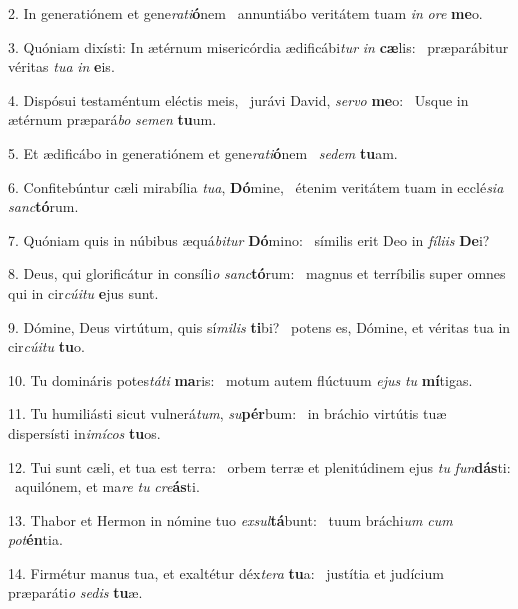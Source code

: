 2. In generatiónem et gene\textit{ra}\textit{ti}\textbf{ó}nem \ast\  annuntiábo veritátem tuam \textit{in} \textit{o}\textit{re} \textbf{me}o.\

3. Quóniam dixísti: In ætérnum misericórdia ædificábi\textit{tur} \textit{in} \textbf{cæ}lis: \ast\  præparábitur véritas \textit{tu}\textit{a} \textit{in} \textbf{e}is.\

4. Dispósui testaméntum eléctis meis, \dag\  jurávi David, \textit{ser}\textit{vo} \textbf{me}o: \ast\  Usque in ætérnum præpará\textit{bo} \textit{se}\textit{men} \textbf{tu}um.\

5. Et ædificábo in generatiónem et gene\textit{ra}\textit{ti}\textbf{ó}nem \ast\  \textit{se}\textit{dem} \textbf{tu}am.\

6. Confitebúntur cæli mirabília \textit{tu}\textit{a}, \textbf{Dó}mine, \ast\  étenim veritátem tuam in ecclé\textit{si}\textit{a} \textit{sanc}\textbf{tó}rum.\

7. Quóniam quis in núbibus æquá\textit{bi}\textit{tur} \textbf{Dó}mino: \ast\  símilis erit Deo in \textit{fí}\textit{li}\textit{is} \textbf{De}i?\

8. Deus, qui glorificátur in consíli\textit{o} \textit{sanc}\textbf{tó}rum: \ast\  magnus et terríbilis super omnes qui in cir\textit{cú}\textit{i}\textit{tu} \textbf{e}jus sunt.\

9. Dómine, Deus virtútum, quis sí\textit{mi}\textit{lis} \textbf{ti}bi? \ast\  potens es, Dómine, et véritas tua in cir\textit{cú}\textit{i}\textit{tu} \textbf{tu}o.\

10. Tu domináris potes\textit{tá}\textit{ti} \textbf{ma}ris: \ast\  motum autem flúctuum \textit{e}\textit{jus} \textit{tu} \textbf{mí}tigas.\

11. Tu humiliásti sicut vulnerá\textit{tum}, \textit{su}\textbf{pér}bum: \ast\  in bráchio virtútis tuæ dispersísti in\textit{i}\textit{mí}\textit{cos} \textbf{tu}os.\

12. Tui sunt cæli, et tua est terra: \dag\  orbem terræ et plenitúdinem ejus \textit{tu} \textit{fun}\textbf{dás}ti: \ast\  aquilónem, et ma\textit{re} \textit{tu} \textit{cre}\textbf{ás}ti.\

13. Thabor et Hermon in nómine tuo \textit{ex}\textit{sul}\textbf{tá}bunt: \ast\  tuum bráchi\textit{um} \textit{cum} \textit{pot}\textbf{én}tia.\

14. Firmétur manus tua, et exaltétur déx\textit{te}\textit{ra} \textbf{tu}a: \ast\  justítia et judícium præparáti\textit{o} \textit{se}\textit{dis} \textbf{tu}æ.\

